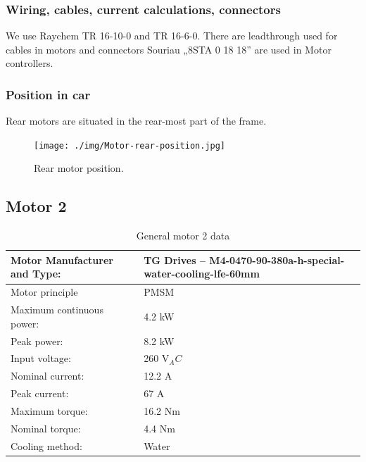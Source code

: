 \subsubsection{Wiring, cables, current calculations, connectors}
We use Raychem TR 16-10-0 and TR 16-6-0. There are leadthrough used for cables in motors and connectors Souriau „8STA 0 18 18” are used in Motor controllers.

\subsubsection{Position in car}

Rear motors are situated in the rear-most part of the frame.
\begin{figure}[H]
	\centering
	\texttt{[image: ./img/Motor-rear-position.jpg]}
	\caption{Rear motor position.}
	\label{fig:Motor-rear-position}
\end{figure}

\subsection{Motor 2}%

\begin{table}[H]
	\centering
	\caption{General motor 2 data}
	\begin{tabu}{|X|X|}\hline
		Motor Manufacturer and Type: & TG Drives – M4-0470-90-380a-h-special-water-cooling-lfe-60mm \\\hline
		Motor principle & PMSM \\\hline
		Maximum continuous power: & 4.2 kW \\\hline
		Peak power: & 8.2 kW \\\hline
		Input voltage: & 260 V$_AC$ \\\hline
		Nominal current: & 12.2 A \\\hline
		Peak current: & 67 A \\\hline
		Maximum torque: & 16.2 Nm \\\hline
		Nominal torque: & 4.4 Nm \\\hline
		Cooling method: & Water \\\hline
	\end{tabu}%
	\label{tab:motors2-general}%
\end{table}%

